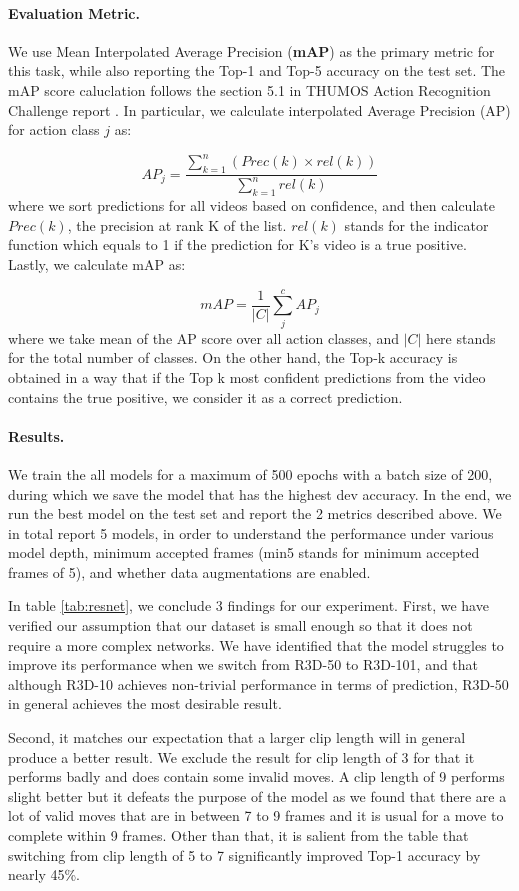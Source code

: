 \documentclass[10pt,twocolumn,letterpaper]{article}
\begin{document}
\paragraph{Evaluation Metric.}
We use Mean Interpolated Average Precision (\textbf{mAP}) as the primary metric for this task, while also reporting the Top-1 and Top-5 accuracy on the test set. The mAP score caluclation follows the section 5.1 in THUMOS Action Recognition Challenge report \cite{thumos}. In particular, we calculate interpolated Average Precision (AP) for action class $j$ as:

\[
    AP_j = \frac{\sum_{k=1}^n(Prec(k) \times rel(k))}
    {\sum_{k=1}^n rel(k)}
\]
where we sort predictions for all videos based on confidence, and then calculate $Prec(k)$, the precision at rank K of the list. $rel(k)$ stands for the indicator function which equals to 1 if the prediction for K's video is a true positive. Lastly, we calculate mAP as:

\[
    mAP = \frac{1}{|C|} \sum_{j}^c AP_j
\]
where we take mean of the AP score over all action classes, and $|C|$ here stands for the total number of classes. On the other hand, the Top-k accuracy is obtained in a way that if the Top k most confident predictions from the video contains the true positive, we consider it as a correct prediction.

\paragraph{Results.}
We train the all models for a maximum of 500 epochs with a batch size of 200, during which we save the model that has the highest dev accuracy. In the end, we run the best model on the test set and report the 2 metrics described above. We in total report 5 models, in order to understand the performance under various model depth, minimum accepted frames (min5 stands for minimum accepted frames of 5), and whether data augmentations are enabled.

In table \ref{tab:resnet}, we conclude 3 findings for our experiment. First, we have verified our assumption that our dataset is small enough so that it does not require a more complex networks. We have identified that the model struggles to improve its performance when we switch from R3D-50 to R3D-101, and that although R3D-10 achieves non-trivial performance in terms of prediction, R3D-50 in general achieves the most desirable result.

Second, it matches our expectation that a larger clip length will in general produce a better result. We exclude the result for clip length of 3 for that it performs badly and does contain some invalid moves. A clip length of 9 performs slight better but it defeats the purpose of the model as we found that there are a lot of valid moves that are in between 7 to 9 frames and it is usual for a move to complete within 9 frames. Other than that, it is salient from the table that switching from clip length of 5 to 7 significantly improved Top-1 accuracy by nearly 45\%. 
\end{document}
